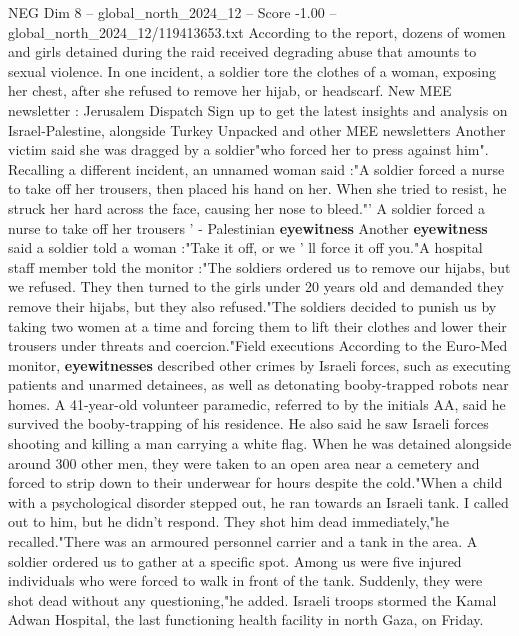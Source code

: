 \begin{textsample}{NEG Dim 8 – global\_north\_2024\_12 – Score -1.00 – global\_north\_2024\_12/119413653.txt}  \label{ex:f8_neg_120}
According to the report, dozens of women and girls detained during the raid received degrading abuse that amounts to sexual violence.
In one incident, a soldier tore the clothes of a woman, exposing her chest, after she refused to remove her hijab, or headscarf.
New MEE newsletter : Jerusalem Dispatch Sign up to get the latest insights and analysis on Israel-Palestine, alongside Turkey Unpacked and other MEE newsletters Another victim said she was dragged by a soldier"who forced her to press against him".
Recalling a different incident, an unnamed woman said :"A soldier forced a nurse to take off her trousers, then placed his hand on her.
When she tried to resist, he struck her hard across the face, causing her nose to bleed."' A soldier forced a nurse to take off her trousers ' - Palestinian \textbf{eyewitness} Another \textbf{eyewitness} said a soldier told a woman :"Take it off, or we ' ll force it off you."A hospital staff member told the monitor :"The soldiers ordered us to remove our hijabs, but we refused.
They then turned to the girls under 20 years old and demanded they remove their hijabs, but they also refused."The soldiers decided to punish us by taking two women at a time and forcing them to lift their clothes and lower their trousers under threats and coercion."Field executions According to the Euro-Med monitor, \textbf{eyewitnesses} described other crimes by Israeli forces, such as executing patients and unarmed detainees, as well as detonating booby-trapped robots near homes.
A 41-year-old volunteer paramedic, referred to by the initials AA, said he survived the booby-trapping of his residence.
He also said he saw Israeli forces shooting and killing a man carrying a white flag.
When he was detained alongside around 300 other men, they were taken to an open area near a cemetery and forced to strip down to their underwear for hours despite the cold."When a child with a psychological disorder stepped out, he ran towards an Israeli tank.
I called out to him, but he didn't respond.
They shot him dead immediately,"he recalled."There was an armoured personnel carrier and a tank in the area.
A soldier ordered us to gather at a specific spot.
Among us were five injured individuals who were forced to walk in front of the tank.
Suddenly, they were shot dead without any questioning,"he added.
Israeli troops stormed the Kamal Adwan Hospital, the last functioning health facility in north Gaza, on Friday.

\end{textsample}
